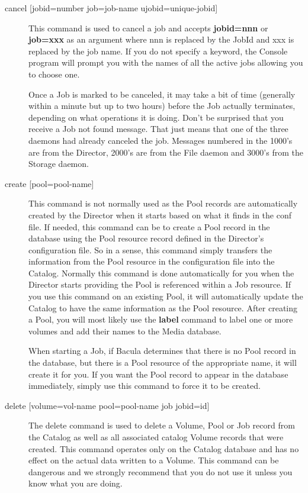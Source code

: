 \begin{description}
\item [{cancel [jobid=\lt{}number\gt{} job=\lt{}job-name\gt{} ujobid=\lt{}unique-jobid\gt{}]}]
   This command is used to cancel a job and accepts {\bf jobid=nnn} or {\bf
   job=xxx} as an argument where nnn is replaced by the JobId and xxx is
   replaced by the job name.  If you do not specify a keyword, the Console
   program will prompt you with the names of all the active jobs allowing
   you to choose one.

   Once a Job is marked to be canceled, it may take a bit of time
   (generally within a minute but up to two hours) before the Job actually 
   terminates, depending on what operations it is doing.
   Don't be surprised that you receive a Job not found message. That just
   means that one of the three daemons had already canceled the job.
   Messages numbered in the 1000's are from the Director, 2000's are from
   the File daemon and 3000's from the Storage daemon.


\item [{create [pool=\lt{}pool-name\gt{}]}]
   This command is not normally used as the Pool records are automatically
   created by the Director when it starts based on what it finds in
   the conf file.  If needed, this command can be 
   to create a Pool record in the database using the
   Pool resource record defined in the Director's configuration file.  So
   in a sense, this command simply transfers the information from the Pool
   resource in the configuration file into the Catalog.  Normally this
   command is done automatically for you when the Director starts providing
   the Pool is referenced within a Job resource.  If you use this command
   on an existing Pool, it will automatically update the Catalog to have
   the same information as the Pool resource.  After creating a Pool, you
   will most likely use the {\bf label} command to label one or more
   volumes and add their names to the Media database.

   When starting a Job, if Bacula determines that there is no Pool record
   in the database, but there is a Pool resource of the appropriate name,
   it will create it for you.  If you want the Pool record to appear in the
   database immediately, simply use this command to force it to be created.

\item [{delete [volume=\lt{}vol-name\gt{} pool=\lt{}pool-name\gt{}  job
   jobid=\lt{}id\gt{}]}]
   The delete command is used to delete a Volume, Pool or Job record from
   the Catalog as well as all associated catalog Volume records that were
   created.  This command operates only on the Catalog database and has no
   effect on the actual data written to a Volume.  This command can be
   dangerous and we strongly recommend that you do not use it unless you
   know what you are doing.


\end{description}
